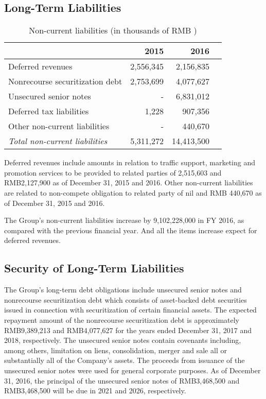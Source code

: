 \subsection{Long-Term Liabilities}
\begin{table}[H]	
	\begin{center}
		\begin{tabular}{lrrr}
			\toprule
			&\textbf{2015}&\textbf{2016}\\
			\midrule
			Deferred revenues& 	2,556,345&	2,156,835\\
			Nonrecourse securitization debt  &	2,753,699&	4,077,627\\
			Unsecured senior notes  &	-&	6,831,012\\
			Deferred tax liabilities &	1,228&	907,356\\
			Other non-current liabilities &	-&	440,670\\
			\qquad\emph{Total non-current liabilities}&	5,311,272&	14,413,500\\
			\bottomrule
		\end{tabular}
	\end{center}
	\caption{Non-current liabilities (in thousands of RMB \textyen)}\label{table:1}
\end{table}

Deferred revenues include amounts in relation to traffic support, marketing and promotion services to be provided to related parties of 2,515,603 and RMB2,127,900 as of December 31, 2015 and 2016. Other non-current liabilities are related to non-compete obligation to related party of nil and RMB 440,670 as of December 31, 2015 and 2016.

The Group’s non-current liabilities increase by 9,102,228,000 in FY 2016, as compared with the previous financial year. And all the items increase expect for deferred revenues.

\subsection{Security of Long-Term Liabilities}
The Group’s long-term debt obligations include unsecured senior notes and nonrecourse securitization debt which consists of asset-backed debt securities issued in connection with securitization of certain financial assets. The expected repayment amount of the nonrecourse securitization debt is approximately RMB9,389,213 and RMB4,077,627 for the years ended December 31, 2017 and 2018, respectively. The unsecured senior notes contain covenants including, among others, limitation on liens, consolidation, merger and sale all or substantially all of the Company’s assets. The proceeds from issuance of the unsecured senior notes were used for general corporate purposes. As of December 31, 2016, the principal of the unsecured senior notes of RMB3,468,500 and RMB3,468,500 will be due in 2021 and 2026, respectively.


